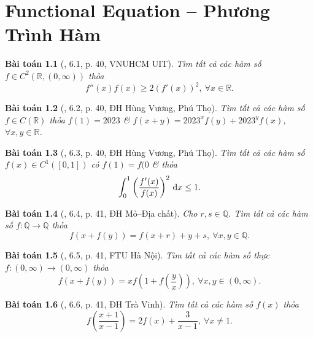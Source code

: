 \documentclass[oneside]{book}
\newtheorem{baitoan}{Bài toán}
\begin{document}

\chapter{Functional Equation -- Phương Trình Hàm}
\minitoc

\begin{baitoan}[\cite{VMS_VMC2023}, 6.1, p. 40, VNUHCM UIT]
	Tìm tất cả các hàm số $f\in C^2(\mathbb{R},(0,\infty))$ thỏa
	\begin{equation*}
		f''(x)f(x)\ge2(f'(x))^2,\ \forall x\in\mathbb{R}.
	\end{equation*}
\end{baitoan}

\begin{baitoan}[\cite{VMS_VMC2023}, 6.2, p. 40, ĐH Hùng Vương, Phú Thọ]
	Tìm tất cả các hàm số $f\in C(\mathbb{R})$ thỏa $f(1) = 2023$ \& $f(x + y) = 2023^xf(y) + 2023^yf(x)$, $\forall x,y\in\mathbb{R}$.
\end{baitoan}

\begin{baitoan}[\cite{VMS_VMC2023}, 6.3, p. 40, ĐH Hùng Vương, Phú Thọ]
	Tìm tất cả các hàm số $f(x)\in C^1([0,1])$ có $f(1) = f(0$ \& thỏa
	\begin{equation*}
		\int_0^1 \left(\dfrac{f'(x)}{f(x)}\right)^2\,{\rm d}x\le1.
	\end{equation*}
\end{baitoan}

\begin{baitoan}[\cite{VMS_VMC2023}, 6.4, p. 41, ĐH Mỏ--Địa chất]
	Cho $r,s\in\mathbb{Q}$. Tìm tất cả các hàm số $f:\mathbb{Q}\to\mathbb{Q}$ thỏa
	\begin{equation*}
		f(x + f(y)) = f(x + r) + y + s,\ \forall x,y\in\mathbb{Q}.
	\end{equation*}
\end{baitoan}

\begin{baitoan}[\cite{VMS_VMC2023}, 6.5, p. 41, FTU Hà Nội]
	Tìm tất cả các hàm số thực $f:(0,\infty)\to(0,\infty)$ thỏa
	\begin{equation*}
		f(x + f(y)) = xf\left(1 + f\left(\frac{y}{x}\right)\right),\ \forall x,y\in(0,\infty).
	\end{equation*}
\end{baitoan}

\begin{baitoan}[\cite{VMS_VMC2023}, 6.6, p. 41, ĐH Trà Vinh]
	Tìm tất cả các hàm số $f(x)$ thỏa
	\begin{equation*}
		f\left(\frac{x + 1}{x - 1}\right) = 2f(x) + \frac{3}{x - 1},\ \forall x\ne1.
	\end{equation*}
\end{baitoan}
\end{document}
